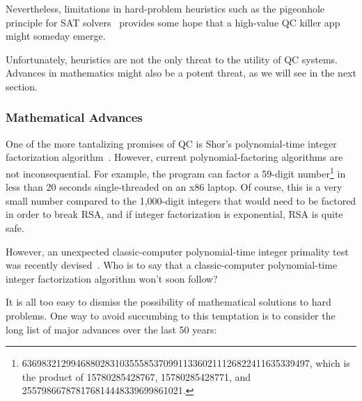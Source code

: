 Nevertheless, limitations in hard-problem heuristics such as the
pigeonhole principle for SAT
solvers~\cite[page~38]{Kroening:2008:DPA:1391237}
provides some hope that a high-value QC killer app might someday emerge.

Unfortunately, heuristics are not the only threat to the utility
of QC systems.
Advances in mathematics might also be a potent threat, as we will see
in the next section.

\subsubsection{Mathematical Advances}
\label{sec:future:Mathematical Advances}

One of the more tantalizing promises of QC is Shor's
polynomial-time integer factorization
algorithm~\cite{Shor:1997:PAP:264393.264406,WikipediaShorsAlgorithm}.
However, current polynomial-factoring algorithms are not
inconsequential.
For example, the  program can factor a 59-digit number\footnote{
	\scriptsize
	63698321299468802831035558537099113360211126822411635339497,
	which is the product of 15780285428767, 15780285428771, and
	255798667878176814448339699861021.}
in less than 20 seconds single-threaded on an x86 laptop.
Of course, this is a very small number compared to the 1,000-digit
integers that would need to be factored in order to break RSA,
and if integer factorization is exponential, RSA is quite safe.

However, an unexpected classic-computer
polynomial-time integer primality test was recently
devised~\cite{ManindraAgrawal2004PrimesIsInP,WikipediaAKSPrimalityTest}.
Who is to say that a classic-computer polynomial-time integer
factorization algorithm won't soon follow?

It is all too easy to dismiss the possibility of mathematical solutions
to hard problems.
One way to avoid succumbing to this temptation is to consider the
long list of major advances over the last 50 years:


